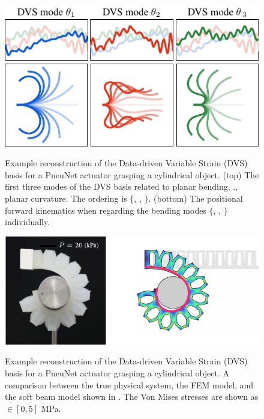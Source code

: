 \begin{figure}[!t]
\centering
\includegraphics*[width=.8\textwidth]{./pdf/thesis-figure-6-11-2.pdf}  \\[0.15em]
\includegraphics*[width=.8\textwidth]{./pdf/thesis-figure-6-11-3.pdf}%
% 
\caption{\small Example reconstruction of the Data-driven Variable Strain (DVS) basis for a PneuNet actuator grasping a cylindrical object. (top) The first three modes of the DVS basis related to planar bending, \ie., planar curvature. The ordering is $\{$, , $\}$. (bottom) The positional forward kinematics when regarding the bending modes $\{$, , $\}$ individually.}
\label{fig:C5:gvis_modes}
\end{figure}
%

\begin{figure}[!t]
\centering
\includegraphics*[width=.85\textwidth]{./pdf/thesis-figure-6-11-1.pdf} \\[0.15em]
% 
\caption{\small Example reconstruction of the Data-driven Variable Strain (DVS) basis for a PneuNet actuator grasping a cylindrical object. A comparison between the true physical system, the FEM model, and the soft beam model shown in . The Von Mises stresses are shown as \protect{}$\!\!\in [0,5]$ \si{\mega \pascal}.}
\vspace{-6mm}
\label{fig:C5:gvis_experiment}
\end{figure}

